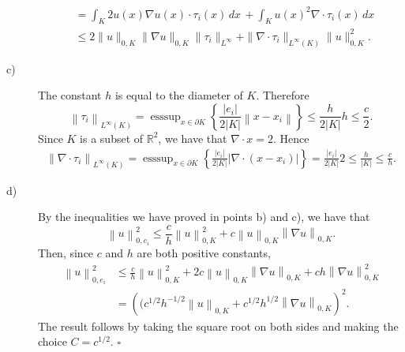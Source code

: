 \documentclass[a4paper]{article}
\DeclareMathOperator*{\esssup}{ess\sup}
\newcommand{\dx}{\, dx \,}
\newcommand{\area}[1]{\left\lvert #1 \right\rvert}
\newcommand{\abs}[1]{\left\lvert #1 \right\rvert}
\newcommand{\norm}[1]{\left\lVert #1 \right\rVert}
\newcommand{\R}{\mathbb{R}}
\begin{document}
\begin{description}
\begin{align*}
&	= \int_K 2u(x) \nabla u(x) \cdot \tau_i(x) \dx
	+ \int_K u(x)^2 \nabla\!\cdot \tau_i(x) \dx \\
&	\leq 2\|u\|_{0,K}\|\nabla u\|_{0,K}\|\tau_i\|_{L^\infty}
	+ \|\nabla\cdot\tau_i\|_{L^\infty(K)}\|u\|^2_{0,K}.
	\end{align*}
\item[c)] The constant $h$ is equal to the diameter of $K$. Therefore
	\[
	\norm{\tau_i}_{L^\infty(K)}
	= \esssup_{x\in\partial K} \left\lbrace \frac{|e_i|}{2|K|}\norm{x-x_i} \right\rbrace
	\leq \frac{h}{2\area{K}} h
	\leq \frac{c}{2}.
	\]
	Since $K$ is a subset of $\R^2$, we have that $\nabla\!\cdot x = 2 $. Hence
	\begin{gather*}
	\norm{\nabla\!\cdot\tau_i}_{L^\infty(K)}
	= \esssup_{x\in\partial K} \left\lbrace \frac{|e_i|}{2|K|}
		\abs{\nabla\!\cdot (x-x_i)} \right\rbrace
	= \frac{|e_i|}{2\area{K}} 2
	\leq \frac{h}{\area{K}}
	\leq \frac{c}{h}.
	\end{gather*}
\item[d)] By the inequalities we have proved in points b) and c), we have that
	\[
	\norm{u}^2_{0,e_i}
	\leq \frac{c}{h}\norm{u}^2_{0,K} + c\norm{u}_{0,K}\norm{\nabla u}_{0,K}.
	\]
	Then, since $c$ and $h$ are both positive constants,
	\begin{align*}
	\norm{u}^2_{0,e_i}
&	\leq \frac{c}{h}\norm{u}^2_{0,K}
	+ 2c\norm{u}_{0,K}\norm{\nabla u}_{0,K}
	+ ch\norm{\nabla u}^2_{0,K} \\
&	= \left( (c^{1/2} h^{-1/2} \norm{u}_{0,K}
		+ c^{1/2} h^{1/2} \norm{\nabla u}_{0,K} \right)^2.
	\end{align*}
	The result follows by taking the square root on both sides and making
	the choice $C = c^{1/2}$. $\square$
\end{description}
\end{document}
